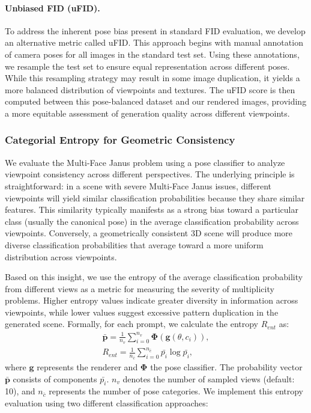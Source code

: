 \paragraph{Unbiased FID (uFID).}
To address the inherent pose bias present in standard FID evaluation, we develop an alternative metric called uFID. This approach begins with manual annotation of camera poses for all images in the standard test set. Using these annotations, we resample the test set to ensure equal representation across different poses. While this resampling strategy may result in some image duplication, it yields a more balanced distribution of viewpoints and textures. The uFID score is then computed between this pose-balanced dataset and our rendered images, providing a more equitable assessment of generation quality across different viewpoints.

\subsubsection{Categorial Entropy for Geometric Consistency}
We evaluate the Multi-Face Janus problem using a pose classifier to analyze viewpoint consistency across different perspectives. The underlying principle is straightforward: in a scene with severe Multi-Face Janus issues, different viewpoints will yield similar classification probabilities because they share similar features. This similarity typically manifests as a strong bias toward a particular class (usually the canonical pose) in the average classification probability across viewpoints. Conversely, a geometrically consistent 3D scene will produce more diverse classification probabilities that average toward a more uniform distribution across viewpoints.

Based on this insight, we use the entropy of the average classification probability from different views as a metric for measuring the severity of multiplicity problems. Higher entropy values indicate greater diversity in information across viewpoints, while lower values suggest excessive pattern duplication in the generated scene. Formally, for each prompt, we calculate the entropy $R_{ent}$ as:
\begin{equation}
    \begin{gathered}
        \bar{\boldsymbol{p}} = \frac{1}{n_v}\sum_{i=0}^{n_v} \boldsymbol{\Phi} (\boldsymbol{g}(\theta,c_i)), \\
        R_{ent} = \frac{1}{n_{\bar{c}}}\sum_{i=0}^{n_{\bar{c}}} \bar{p_i}\log\bar{p_i},
    \end{gathered}
\end{equation}
where $\boldsymbol{g}$ represents the renderer and $\boldsymbol{\Phi}$ the pose classifier. The probability vector $\bar{\boldsymbol{p}}$ consists of components $\bar{p_i}$. $n_v$ denotes the number of sampled views (default: 10), and $n_{\bar{c}}$ represents the number of pose categories. We implement this entropy evaluation using two different classification approaches:

